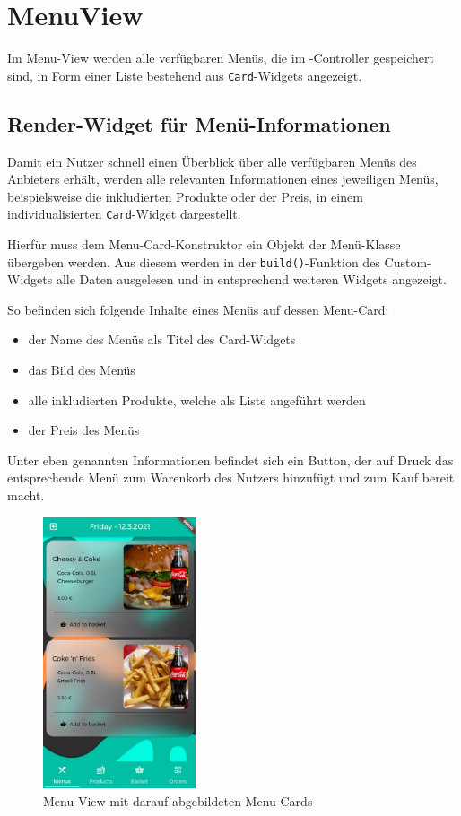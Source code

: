 \section{MenuView}

Im Menu-View werden alle verfügbaren Menüs, die im -Controller gespeichert
sind, in Form einer Liste bestehend aus \lstinline{Card}-Widgets angezeigt.

\subsection{Render-Widget für Menü-Informationen}

Damit ein Nutzer schnell einen Überblick über alle verfügbaren Menüs des Anbieters erhält,
werden alle relevanten Informationen eines jeweiligen Menüs, beispielsweise die inkludierten
Produkte oder der Preis, in einem individualisierten \lstinline{Card}-Widget dargestellt.

Hierfür muss dem Menu-Card-Konstruktor ein Objekt der Menü-Klasse übergeben werden. Aus diesem
werden in der \lstinline{build()}-Funktion des Custom-Widgets alle Daten ausgelesen und in 
entsprechend weiteren Widgets angezeigt.

So befinden sich folgende Inhalte eines Menüs auf dessen Menu-Card:

\begin{itemize}
    \item der Name des Menüs als Titel des Card-Widgets
    \item das Bild des Menüs
    \item alle inkludierten Produkte, welche als Liste angeführt werden
    \item der Preis des Menüs
\end{itemize}

Unter eben genannten Informationen befindet sich ein Button, der auf Druck das entsprechende Menü
zum Warenkorb des Nutzers hinzufügt und zum Kauf bereit macht.

\begin{figure}[H]
    \centering
    \includegraphics[width=0.40\textwidth]{images/Client/views/menuview/menuView.png}
    \caption{Menu-View mit darauf abgebildeten Menu-Cards}
\end{figure}

